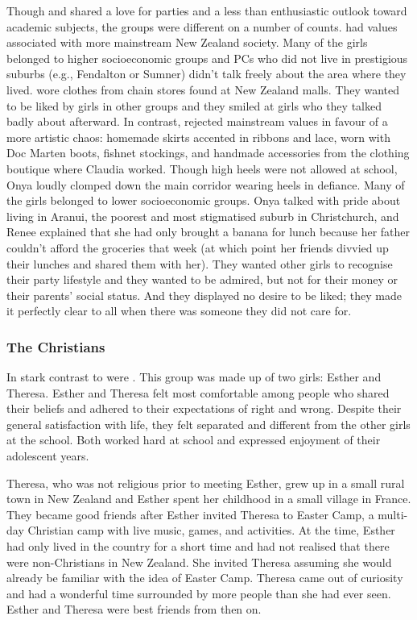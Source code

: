Though  and  shared a love for parties and a less than enthusiastic outlook toward academic subjects, the groups were different on a number of counts.  had values associated with more mainstream New Zealand society. Many of the girls belonged to higher socioeconomic groups and PCs who did not live in prestigious suburbs (e.g., Fendalton or Sumner) didn't talk freely about the area where they lived.  wore clothes from chain stores found at New Zealand malls. They wanted to be liked by girls in other groups and they smiled at girls who they talked badly about afterward. In contrast,  rejected mainstream values in favour of a more artistic chaos: homemade skirts accented in ribbons and lace, worn with Doc Marten boots, fishnet stockings, and handmade accessories from the clothing boutique where Claudia worked. Though high heels were not allowed at school, Onya loudly clomped down the main corridor wearing heels in defiance. Many of the girls belonged to lower socioeconomic groups. Onya talked with pride about living in Aranui, the poorest and most stigmatised suburb in Christchurch, and Renee explained that she had only brought a banana for lunch because her father couldn't afford the groceries that week (at which point her friends divvied up their lunches and shared them with her). They wanted other girls to recognise their party lifestyle and they wanted to be admired, but not for their money or their parents' social status. And they displayed no desire to be liked; they made it perfectly clear to all when there was someone they did not care for.

\subsubsection{The Christians}

In stark contrast to  were . This group was made up of two girls: Esther and Theresa. Esther and Theresa felt most comfortable among people who shared their beliefs and adhered to their expectations of right and wrong. Despite their general satisfaction with life, they felt separated and different from the other girls at the school. Both worked hard at school and expressed enjoyment of their adolescent years.
 
Theresa, who was not religious prior to meeting Esther, grew up in a small rural town in New Zealand and Esther spent her childhood in a small village in France. They became good friends after Esther invited Theresa to Easter Camp, a multi-day Christian camp with live music, games, and activities. At the time, Esther had only lived in the country for a short time and had not realised that there were non-Christians in New Zealand. She invited Theresa assuming she would already be familiar with the idea of Easter Camp. Theresa came out of curiosity and had a wonderful time surrounded by more people than she had ever seen. Esther and Theresa were best friends from then on. 

